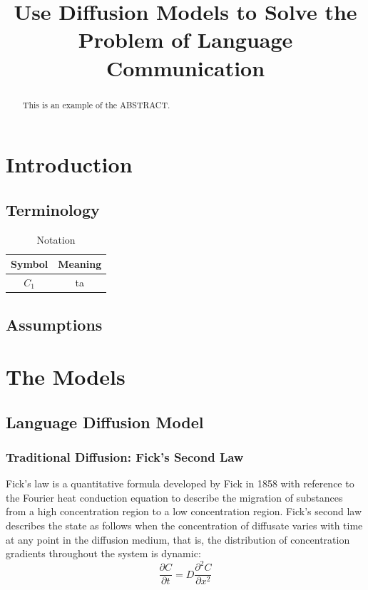 \documentclass{mcmthesis}
\title{Use Diffusion Models to Solve the Problem of Language Communication}
\begin{document}
\setlength{parindent}{2em}%

  \begin{abstract}
    This is an example of the ABSTRACT.
  \end{abstract}

  \maketitle
  \tableofcontents

  \section{Introduction}%

    \subsection{Terminology}%

    \begin{table}[h]
    \centering
    \caption{Notation}

    \begin{tabular}{cc}
    \toprule
    Symbol&Meaning\\
    \midrule
    {$C_1$}&ta\\
    \bottomrule
    \end{tabular}
  \end{table}
    \subsection{Assumptions}%

  \section{The Models}


    \subsection{Language Diffusion Model}%
    \subsubsection{Traditional Diffusion: Fick's Second Law}%

    Fick's law is a quantitative formula developed by Fick in 1858
    with reference to the Fourier heat conduction equation
    to describe the migration of substances
    from a high concentration region to a low concentration region.
    Fick's second law describes the state as follows
    when the concentration of diffusate varies with time at any point in the diffusion medium,
    that is, the distribution of concentration gradients throughout the system is dynamic:
    $$\frac{\partial C}{\partial t}=D\frac{\partial^2C}{\partial x^2}$$
\end{document}

